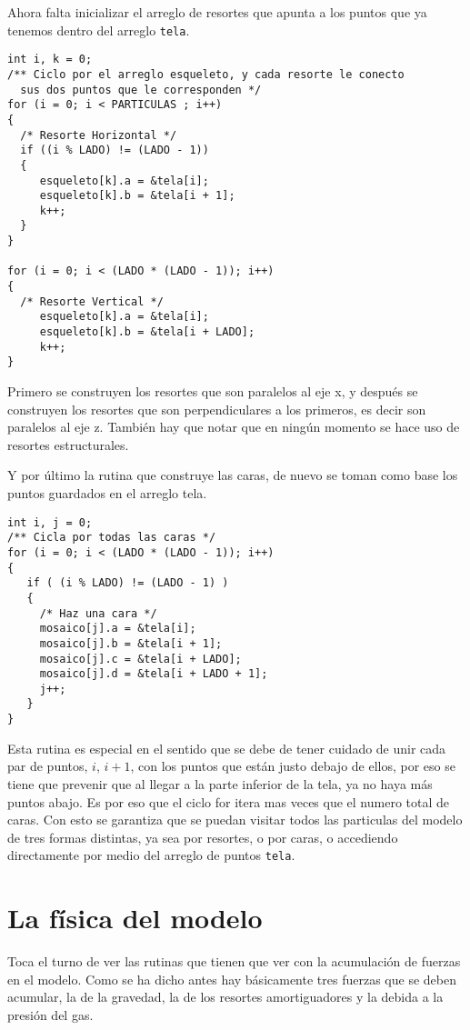 Ahora falta inicializar el arreglo de resortes que apunta a los puntos que ya tenemos dentro del arreglo \verb|tela|.
\begin{verbatim}
int i, k = 0;
/** Ciclo por el arreglo esqueleto, y cada resorte le conecto 
  sus dos puntos que le corresponden */
for (i = 0; i < PARTICULAS ; i++)
{
  /* Resorte Horizontal */
  if ((i % LADO) != (LADO - 1))
  {
     esqueleto[k].a = &tela[i];
     esqueleto[k].b = &tela[i + 1];
     k++;
  }
}

for (i = 0; i < (LADO * (LADO - 1)); i++)
{
  /* Resorte Vertical */
     esqueleto[k].a = &tela[i];
     esqueleto[k].b = &tela[i + LADO];
     k++;
}
\end{verbatim} 
Primero se construyen los resortes que son paralelos al eje x, y después se construyen los resortes que son perpendiculares a los primeros, es decir son paralelos al eje z. También hay que notar que en ningún momento se hace uso de resortes estructurales.

Y por último la rutina que construye las caras, de nuevo se toman como base los puntos guardados en el arreglo tela.
\begin{verbatim}
int i, j = 0;
/** Cicla por todas las caras */
for (i = 0; i < (LADO * (LADO - 1)); i++)
{
   if ( (i % LADO) != (LADO - 1) )
   {
     /* Haz una cara */
     mosaico[j].a = &tela[i];
     mosaico[j].b = &tela[i + 1];
     mosaico[j].c = &tela[i + LADO];
     mosaico[j].d = &tela[i + LADO + 1];
     j++;
   }
}
\end{verbatim} 
Esta rutina es especial en el sentido que se debe de tener cuidado de unir cada par de puntos, $i$, $i+1$, con los puntos que están justo debajo de ellos, por eso se tiene que prevenir que al llegar a la parte inferior de la tela, ya no haya más puntos abajo.
Es por eso que el ciclo for itera mas veces que el numero total de caras.
Con esto se garantiza que se puedan visitar todos las particulas del modelo de tres formas distintas, ya sea por resortes, o por caras, o accediendo directamente por medio del arreglo de puntos \verb|tela|.

\section{La física del modelo}
Toca el turno de ver las rutinas que tienen que ver con la acumulación de fuerzas en el modelo.
Como se ha dicho antes hay básicamente tres fuerzas que se deben acumular, la de la gravedad, la de los resortes amortiguadores y la debida a la presión del gas.

